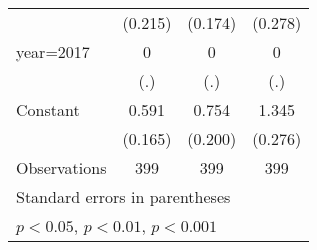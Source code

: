 {\begin{tabular}{l*{3}{c}}
                    &     (0.215)         &     (0.174)         &     (0.278)         \\
[1em]
year=2017           &           0         &           0         &           0         \\
                    &         (.)         &         (.)         &         (.)         \\
[1em]
Constant            &       0.591\sym{***}&       0.754\sym{***}&       1.345\sym{***}\\
                    &     (0.165)         &     (0.200)         &     (0.276)         \\
\hline
Observations        &         399         &         399         &         399         \\
\hline\hline
\multicolumn{4}{l}{\footnotesize Standard errors in parentheses}\\
\multicolumn{4}{l}{\footnotesize \sym{*} \(p<0.05\), \sym{**} \(p<0.01\), \sym{***} \(p<0.001\)}\\
\end{tabular}
}
